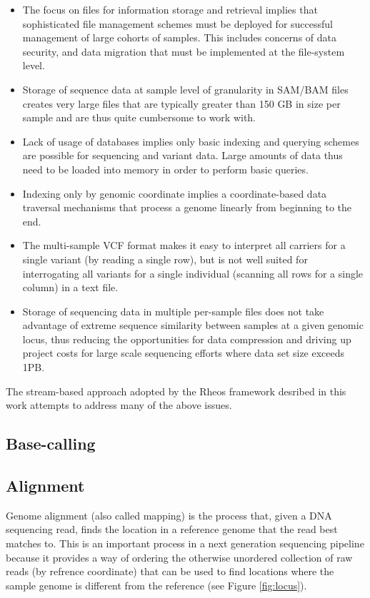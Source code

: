 \begin{itemize}
    \item The focus on files for information storage and retrieval implies that sophisticated file management schemes must be deployed for successful management of large cohorts of samples. This includes concerns of data security, and data migration that must be implemented at the file-system level.
    \item Storage of sequence data at sample level of granularity in SAM/BAM files creates very large files that are typically greater than 150 GB in size per sample and are thus quite cumbersome to work with.
    \item Lack of usage of databases implies only basic indexing and querying schemes are possible for sequencing and variant data. Large amounts of data thus need to be loaded into memory in order to perform basic queries.
    \item Indexing only by genomic coordinate implies a coordinate-based data traversal mechanisms that process a genome linearly from beginning to the end.
    \item The multi-sample VCF format makes it easy to interpret all carriers for a single variant (by reading a single row), but is not well suited for interrogating all variants for a single individual (scanning all rows for a single column) in a text file.
    \item Storage of sequencing data in multiple per-sample files does not take advantage of extreme sequence similarity between samples at a given genomic locus, thus reducing the opportunities for data compression and driving up project costs for large scale sequencing efforts where data set size exceeds 1PB.
\end{itemize}

The stream-based approach adopted by the Rheos framework desribed in this work attempts to address many of the above issues.

\subsection{Base-calling}

\subsection{Alignment}
\label{sec:bg_alignment}

Genome alignment (also called mapping) is the process that, given a DNA sequencing read, finds the location in a reference genome that the read best matches to. This is an important process in a next generation sequencing pipeline because it provides a way of ordering the otherwise unordered collection of raw reads (by refrence coordinate) that can be used to find locations where the sample genome is different from the reference (see Figure \ref{fig:locus}). 

